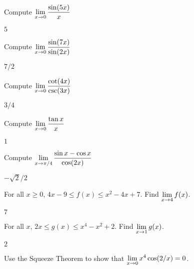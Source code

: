 \begin{exercises}

\twocol

\exercise Compute $\displaystyle\lim_{x\to 0} {\sin (5x)\over x}$
\begin{answer} $5$
\end{answer}



\exercise Compute $\displaystyle\lim_{x\to 0 } {\sin(7x)\over\sin (2x)}$
\begin{answer} $7/2$
\end{answer}

\exercise  Compute $\displaystyle\lim_{x\to 0 } {\cot (4x) \over\csc (3x)}$
\begin{answer} $3/4$
\end{answer}

\exercise Compute $\displaystyle\lim_{x\to 0 } {\tan x\over x}$
\begin{answer} $1$
\end{answer}

\endtwocol

\exercise Compute $\displaystyle\lim_{x\to \pi/4} {\sin x
    -\cos x \over\cos (2x)}$
 \begin{answer} $-\sqrt2/2$
\end{answer}

\exercise  For all $x\geq 0$, $4x-9 \leq f(x) \leq x^2 - 4x +7$. Find
  $\displaystyle\lim_{x\to4}f(x)$.
\begin{answer} $7$
\end{answer}

\exercise  For all $x$, $2x \leq g(x) \leq x^4 - x^2 +2$. Find
  $\displaystyle\lim_{x\to1}g(x)$.
\begin{answer} $2$
\end{answer}

\exercise Use the Squeeze Theorem to show that $\displaystyle\lim_{x\to0} x^4
 \cos(2/x)=0$.

\end{exercises}
